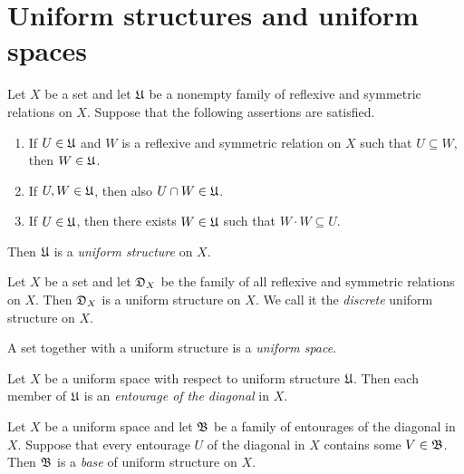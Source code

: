 \documentclass[10pt]{amsart}
\begin{document}
\section{Uniform structures and uniform spaces}

\begin{definition}
	Let $X$ be a set and let ${\mathfrak U}$ be a nonempty family of reflexive and symmetric relations on $X$. Suppose that the following assertions are satisfied.
	\begin{enumerate}[label=\textbf{(\arabic*)}, leftmargin=3.0em]
		\item If $U \in {\mathfrak U}$ and $W$ is a reflexive and symmetric relation on $X$ such that $U \subseteq W$, then $W \in {\mathfrak U}$.
		\item If $U,W \in {\mathfrak U}$, then also $U\cap W \in {\mathfrak U}$.
		\item If $U \in {\mathfrak U}$, then there exists $W \in {\mathfrak U}$ such that $W\cdot W \subseteq U$.
	\end{enumerate}
	Then ${\mathfrak U}$ is a \textit{uniform structure} on $X$.
\end{definition}

\begin{example}\label{example:discrete_uniform_structure}
	Let $X$ be a set and let ${\mathfrak D}_X$ be the family of all reflexive and symmetric relations on $X$. Then ${\mathfrak D}_X$ is a uniform structure on $X$. We call it the \textit{discrete} uniform structure on $X$.
\end{example}

\begin{definition}
	A set together with a uniform structure is a \textit{uniform space}.
\end{definition}

\begin{definition}
	Let $X$ be a uniform space with respect to uniform structure ${\mathfrak U}$. Then each member of ${\mathfrak U}$ is an \textit{entourage of the diagonal} in $X$.
\end{definition}

\begin{definition}
	Let $X$ be a uniform space and let ${\mathfrak B}$ be a family of entourages of the diagonal in $X$. Suppose that every entourage $U$ of the diagonal in $X$ contains some $V\in {\mathfrak B}$. Then ${\mathfrak B}$ is a \textit{base} of uniform structure on $X$.
\end{definition}
\end{document}
